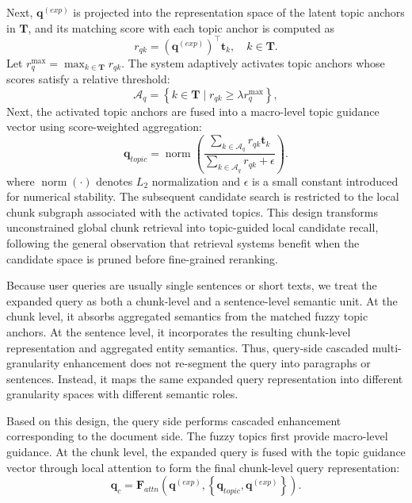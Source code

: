 \documentclass[a4paper,fleqn]{cas-dc}
\begin{document}
Next, $\mathbf{q}^{(exp)}$ is projected into the representation space of the latent topic anchors in $\mathbf{T}$, and its matching score with each topic anchor is computed as
\begin{equation}
r_{qk}
=
\left(\mathbf{q}^{(exp)}\right)^{\top}\mathbf{t}_{k},
\quad k\in\mathbf{T}.
\end{equation}
Let $r_q^{\max}=\max_{k\in\mathbf{T}}r_{qk}$. The system adaptively activates topic anchors whose scores satisfy a relative threshold:
\begin{equation}
\mathcal{A}_{q}
=
\left\{
k\in\mathbf{T}
\mid
r_{qk}\geq\lambda r_q^{\max}
\right\},
\end{equation}
Next, the activated topic anchors are fused into a macro-level topic guidance vector using score-weighted aggregation:
\begin{equation}
\mathbf{q}_{topic}
=
\operatorname{norm}
\left(
\dfrac{\sum_{k\in\mathcal{A}_{q}}r_{qk}\mathbf{t}_{k}}
{\sum_{k\in\mathcal{A}_{q}}r_{qk}+\epsilon}
\right).
\end{equation}
where $\operatorname{norm}(\cdot)$ denotes $L_2$ normalization and $\epsilon$ is a small constant introduced for numerical stability. The subsequent candidate search is restricted to the local chunk subgraph associated with the activated topics. This design transforms unconstrained global chunk retrieval into topic-guided local candidate recall, following the general observation that retrieval systems benefit when the candidate space is pruned before fine-grained reranking.

Because user queries are usually single sentences or short texts, we treat the expanded query as both a chunk-level and a sentence-level semantic unit. At the chunk level, it absorbs aggregated semantics from the matched fuzzy topic anchors. At the sentence level, it incorporates the resulting chunk-level representation and aggregated entity semantics. Thus, query-side cascaded multi-granularity enhancement does not re-segment the query into paragraphs or sentences. Instead, it maps the same expanded query representation into different granularity spaces with different semantic roles.

Based on this design, the query side performs cascaded enhancement corresponding to the document side. The fuzzy topics first provide macro-level guidance. At the chunk level, the expanded query is fused with the topic guidance vector through local attention to form the final chunk-level query representation:
\begin{equation}
\mathbf{q}_{c}
=
\mathbf{F}_{attn}
\left(
\mathbf{q}^{(exp)},
\left\{
\mathbf{q}_{topic},
\mathbf{q}^{(exp)}
\right\}
\right).
\end{equation}
\end{document}
